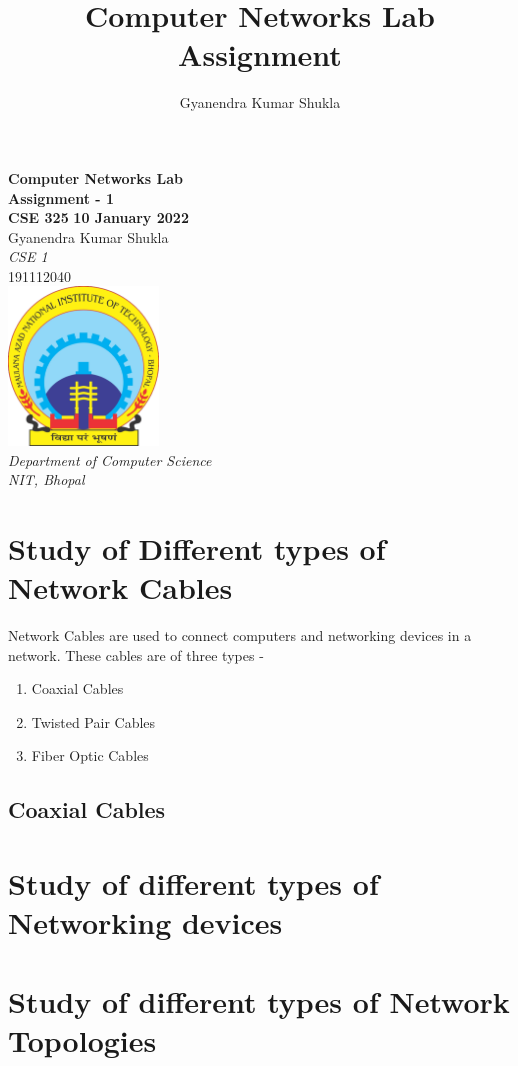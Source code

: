 \documentclass[14pt,a4paper]{article}
\author{Gyanendra Kumar Shukla}
\title{Computer Networks Lab Assignment}
\begin{document}
	\begin{titlepage}
    \centering
    \vfill
    {\bfseries\Huge
        Computer Networks Lab \\
        Assignment - 1\\
        \vskip0.5cm
        CSE 325
    }
    {\LARGE
        \vskip3cm
        \textbf{10 January 2022}\\
        \vskip3cm
        Gyanendra Kumar Shukla\\
        \textit{CSE 1}\\
        191112040\\
    }    
    \vfill
    \vfill
    \includegraphics[width=4cm]{manitlogo.png} %
    \\
    {\textit{
        Department of Computer Science\\
        NIT, Bhopal\\
    }}
    \vfill
    \vfill
\end{titlepage}
		\newpage
	
	
	
\tableofcontents

	
	\newpage

\section{Study of Different types of Network Cables}
Network Cables are used to connect computers and networking devices in a network. These cables are of three types - 
\begin{enumerate}
    \item Coaxial Cables
    \item Twisted Pair Cables
    \item Fiber Optic Cables
\end{enumerate}

\subsection{Coaxial Cables}

\section{Study of different types of Networking devices}

\section{Study of different types of Network Topologies}
\end{document}
